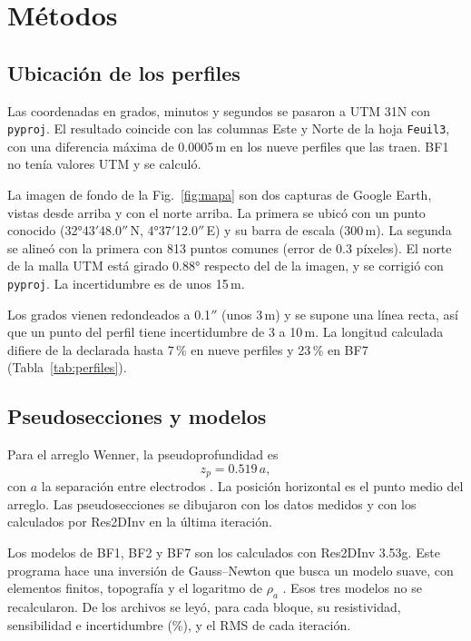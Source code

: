 \documentclass[conference]{IEEEtran}
\begin{document}
\section{M\'etodos}
\subsection{Ubicaci\'on de los perfiles}
Las coordenadas en grados, minutos y segundos se pasaron a UTM 31N con \texttt{pyproj}. El resultado coincide con las columnas Este y Norte de la hoja \texttt{Feuil3}, con una diferencia m\'axima de 0.0005\,m en los nueve perfiles que las traen. BF1 no ten\'ia valores UTM y se calcul\'o.

La imagen de fondo de la Fig.~\ref{fig:mapa} son dos capturas de Google Earth, vistas desde arriba y con el norte arriba. La primera se ubic\'o con un punto conocido (32°43$'$48.0$''$\,N, 4°37$'$12.0$''$\,E) y su barra de escala (300\,m). La segunda se aline\'o con la primera con 813 puntos comunes (error de 0.3 p\'ixeles). El norte de la malla UTM est\'a girado 0.88° respecto del de la imagen, y se corrigi\'o con \texttt{pyproj}. La incertidumbre es de unos 15\,m.

Los grados vienen redondeados a 0.1$''$ (unos 3\,m) y se supone una l\'inea recta, as\'i que un punto del perfil tiene incertidumbre de 3 a 10\,m. La longitud calculada difiere de la declarada hasta 7\,\% en nueve perfiles y 23\,\% en BF7 (Tabla~\ref{tab:perfiles}).

\subsection{Pseudosecciones y modelos}
Para el arreglo Wenner, la pseudoprofundidad es
\begin{equation}
z_p = 0.519\,a, \label{eq:zp}
\end{equation}
con $a$ la separaci\'on entre electrodos \cite{edwards1977}. La posici\'on horizontal es el punto medio del arreglo. Las pseudosecciones se dibujaron con los datos medidos y con los calculados por Res2DInv en la \'ultima iteraci\'on.

Los modelos de BF1, BF2 y BF7 son los calculados con Res2DInv 3.53g. Este programa hace una inversi\'on de Gauss--Newton que busca un modelo suave, con elementos finitos, topograf\'ia y el logaritmo de $\rho_a$ \cite{loke1996}. Esos tres modelos no se recalcularon. De los archivos se ley\'o, para cada bloque, su resistividad, sensibilidad e incertidumbre (\%), y el RMS de cada iteraci\'on.
\end{document}
